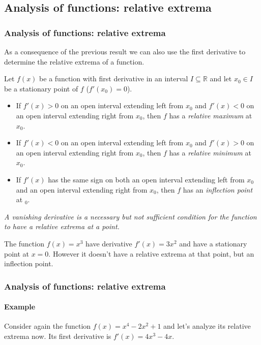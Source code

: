 \subsection{Analysis of functions: relative extrema}
\begin{frame}
\frametitle{Analysis of functions: relative extrema}
As a consequence of the previous result we can also use the first derivative to determine the relative extrema of a function. 
\begin{theorem}
Let $f(x)$ be a function with first derivative in an interval $I\subseteq \mathbb{R}$ and let $x_0\in I$ be a stationary point of $f$ ($f'(x_0)=0$).
\begin{itemize}
\item  If $f'(x)>0$ on an open interval extending left from $x_0$ and $f'(x)<0$ on an open interval extending right from $x_0$, then $f$ has a \emph{relative maximum} at $x_0$.
\item  If $f'(x)<0$ on an open interval extending left from $x_0$ and $f'(x)>0$ on an open interval extending right from $x_0$, then $f$ has a \emph{relative minimum} at $x_0$.
\item If $f'(x)$ has the same sign on both an open interval extending left from $x_0$ and an open interval extending right from $x_0$, then $f$ has an \emph{inflection point} at $_0$.
\end{itemize}
\end{theorem}

 \emph{A vanishing derivative is a necessary but not sufficient condition for the function to have a relative extrema at a point.}

 The function $f(x)=x^3$ have derivative $f'(x)=3x^2$ and have a stationary point at $x=0$.
However it doesn't have a relative extrema at that point, but an inflection point.
\end{frame}


\begin{frame}
\frametitle{Analysis of functions: relative extrema}
\framesubtitle{Example}
Consider again the function $f(x)=x^4-2x^2+1$ and let's analyze its relative extrema now. 
Its first derivative is $f'(x)=4x^3-4x$.
\begin{center}
\scalebox{0.9}{}
\end{center}
\end{frame}



